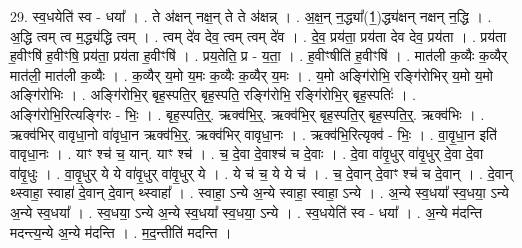 \documentclass[17pt]{extarticle}
\begin{document}
29. स्व॒धयेति॑ स्व - धया᳚ । . ते अ॑क्षन् नक्ष॒न् ते ते अ॑क्षन्न् । . अ॒क्ष॒न् न॒द्ध्या᳚(1॒)द्ध्य॑क्षन् नक्षन् न॒द्धि । . अ॒द्धि त्वम् त्व म॒द्ध्य॑द्धि त्वम् । . त्वम् दे॑व देव॒ त्वम् त्वम् दे॑व । . दे॒व॒ प्रय॑ता॒ प्रय॑ता देव देव॒ प्रय॑ता । . प्रय॑ता ह॒वीꣳषि॑ ह॒वीꣳषि॒ प्रय॑ता॒ प्रय॑ता ह॒वीꣳषि॑ । . प्रय॒तेति॒ प्र - य॒ता॒ । . ह॒वीꣳषीति॑ ह॒वीꣳषि॑ । . मात॑ली क॒व्यैः क॒व्यैर् मात॑ली॒ मात॑ली क॒व्यैः । . क॒व्यैर् य॒मो य॒मः क॒व्यैः क॒व्यैर् य॒मः । . य॒मो अङ्गि॑रोभि॒ रङ्गि॑रोभिर् य॒मो य॒मो अङ्गि॑रोभिः । . अङ्गि॑रोभि॒र् बृह॒स्पति॒र् बृह॒स्पति॒ रङ्गि॑रोभि॒ रङ्गि॑रोभि॒र् बृह॒स्पतिः॑ । . अङ्गि॑रोभि॒रित्यङ्गि॑रः - भिः॒ । . बृह॒स्पति॒र्॒. ऋक्व॑भि॒र्॒. ऋक्व॑भि॒र् बृह॒स्पति॒र् बृह॒स्पति॒र्॒. ऋक्व॑भिः । . ऋक्व॑भिर् वावृधा॒नो वा॑वृधा॒न ऋक्व॑भि॒र्॒. ऋक्व॑भिर् वावृधा॒नः । . ऋक्व॑भि॒रित्यृक्व॑ - भिः॒ । . वा॒वृ॒धा॒न इति॑ वावृधा॒नः । . याꣳ श्च॑ च॒ यान्. याꣳ श्च॑ । . च॒ दे॒वा दे॒वाश्च॑ च दे॒वाः । . दे॒वा वा॑वृ॒धुर् वा॑वृ॒धुर् दे॒वा दे॒वा वा॑वृ॒धुः । . वा॒वृ॒धुर् ये ये वा॑वृ॒धुर् वा॑वृ॒धुर् ये । . ये च॑ च॒ ये ये च॑ । . च॒ दे॒वान् दे॒वाꣳ श्च॑ च दे॒वान् । . दे॒वान् थ्स्वाहा॒ स्वाहा॑ दे॒वान् दे॒वान् थ्स्वाहा᳚ । . स्वाहा॒ ऽन्ये अ॒न्ये स्वाहा॒ स्वाहा॒ ऽन्ये । . अ॒न्ये स्व॒धया᳚ स्व॒धया॒ ऽन्ये अ॒न्ये स्व॒धया᳚ । . स्व॒धया॒ ऽन्ये अ॒न्ये स्व॒धया᳚ स्व॒धया॒ ऽन्ये । . स्व॒धयेति॑ स्व - धया᳚ । . अ॒न्ये म॑दन्ति मदन्त्य॒न्ये अ॒न्ये म॑दन्ति । . म॒द॒न्तीति॑ मदन्ति । \newline
\end{document}
